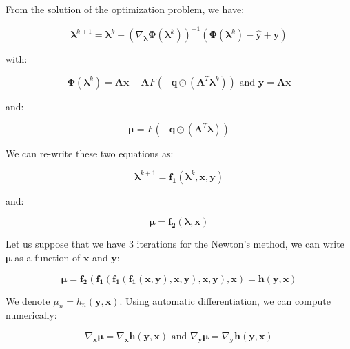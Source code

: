 \documentclass{tex/note}
\begin{document}
From the solution of the optimization problem, we have:

\begin{equation*}
\bm{\lambda}^{k + 1} = \bm{\lambda}^k - \left( \nabla_{\bm{\lambda}} \bm{\Phi} \left( \bm{\lambda}^k \right) \right) ^{-1} \left( \bm{\Phi} \left( \bm{\lambda}^k \right) - \hat{\bm{y}} + \bm{y} \right)
\end{equation*}

with:

\begin{equation*}
\bm{\Phi} \left( \bm{\lambda}^k \right) = \bm{A} \bm{x} - \bm{A} F \left( - \bm{q} \odot \left( \bm{A}^T \bm{\lambda}^k \right) \right) \text{ and } \hat{\bm{y}} = \bm{A} \bm{x}
\end{equation*}

and:

\begin{equation*}
\bm{\mu} = F \left( - \bm{q} \odot \left( \bm{A}^T \bm{\lambda} \right) \right)
\end{equation*}

We can re-write these two equations as:

\begin{equation*}
\bm{\lambda}^{k + 1} = \bm{f_1} \left( \bm{\lambda}^k , \bm{x} , \bm{y} \right)
\end{equation*}

and:

\begin{equation*}
\bm{\mu} = \bm{f_2} \left( \bm{\lambda} , \bm{x} \right) 
\end{equation*}

Let us suppose that we have 3 iterations for the Newton's method, we can write $\bm{\mu}$ as a function of $\bm{x}$ and $\bm{y}$:

\begin{equation*}
\bm{\mu} = \bm{f_2} \left( \bm{f_1} \left( \bm{f_1} \left( \bm{f_1} \left( \bm{x} , \bm{y} \right), \bm{x} , \bm{y} \right), \bm{x} , \bm{y} \right) , \bm{x} \right)
= \bm{h} \left( \bm{y} , \bm{x} \right)
\end{equation*} 

We denote $\mu_n = h_n \left( \bm{y} , \bm{x} \right)$. Using automatic differentiation, we can compute numerically:

\begin{equation*}
\nabla_{\bm{x}} \bm{\mu} = \nabla_{\bm{x}} \bm{h} \left( \bm{y} , \bm{x} \right) \text{ and } \nabla_{\bm{y}} \bm{\mu} = \nabla_{\bm{y}} \bm{h} \left( \bm{y} , \bm{x} \right)
\end{equation*}
\end{document}
